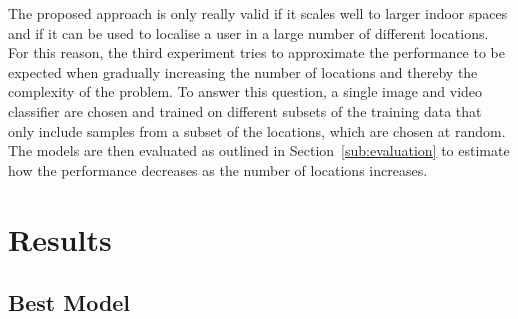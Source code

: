 \documentclass[a4paper]{article}
\begin{document}
  The proposed approach is only really valid if it scales well to larger indoor
  spaces and if it can be used to localise a user in a large number of different
  locations. For this reason, the third experiment tries to approximate the
  performance to be expected when gradually increasing the number of locations
  and thereby the complexity of the problem. To answer this question, a single
  image and video classifier are chosen and trained on different subsets of the
  training data that only include samples from a subset of the locations, which
  are chosen at random. The models are then evaluated as outlined in
  Section~\ref{sub:evaluation} to estimate how the performance decreases as the
  number of locations increases.



  \section{Results} %
  \label{sec:results}

  \subsection{Best Model} %
\end{document}
